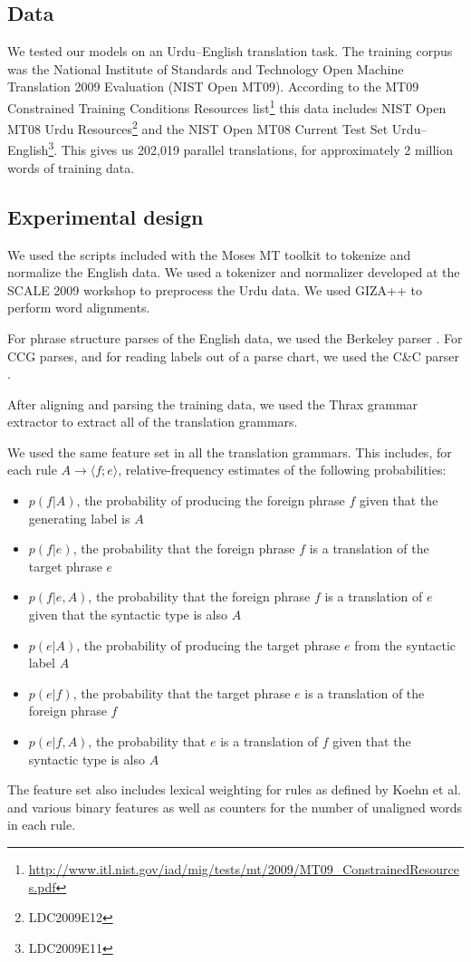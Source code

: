 \documentclass[a4paper]{article}
\begin{document}
\subsection{Data}

We tested our models on an Urdu--English translation task. The training corpus was the National Institute of Standards and Technology Open Machine Translation 2009 Evaluation (NIST Open MT09). According to the MT09 Constrained Training Conditions Resources list\footnote{\url{http://www.itl.nist.gov/iad/mig/tests/mt/2009/MT09_ConstrainedResources.pdf}} this data includes NIST Open MT08 Urdu Resources\footnote{LDC2009E12} and the NIST Open MT08 Current Test Set Urdu--English\footnote{LDC2009E11}. This gives us 202,019 parallel translations, for approximately 2 million words of training data.

\subsection{Experimental design}

We used the scripts included with the Moses MT toolkit \cite{moses} to tokenize and normalize the English data. We used a tokenizer and normalizer developed at the SCALE 2009 workshop \cite{scale09} to preprocess the Urdu data. We used GIZA++ \cite{giza} to perform word alignments.

For phrase structure parses of the English data, we used the Berkeley parser \cite{Petrov-Klein-Inference}. For CCG parses, and for reading labels out of a parse chart, we used the C\&C parser \cite{candc}.

After aligning and parsing the training data, we used the Thrax grammar extractor \cite{joshua3} to extract all of the translation grammars.

We used the same feature set in all the translation grammars. This includes, for each rule $A \to \langle f ; e \rangle$, relative-frequency estimates of the following probabilities:
\begin{itemize}
\item $p(f|A)$, the probability of producing the foreign phrase $f$ given that the generating label is $A$
\item $p(f|e)$, the probability that the foreign phrase $f$ is a translation of the target phrase $e$
\item $p(f|e,A)$, the probability that the foreign phrase $f$ is a translation of $e$ given that the syntactic type is also $A$
\item $p(e|A)$, the probability of producing the target phrase $e$ from the syntactic label $A$
\item $p(e|f)$, the probability that the target phrase $e$ is a translation of the foreign phrase $f$
\item $p(e|f,A)$, the probability that $e$ is a translation of $f$ given that the syntactic type is also $A$
\end{itemize}
The feature set also includes lexical weighting for rules as defined by Koehn et al.  and various binary features as well as counters for the number of unaligned words in each rule.
\end{document}
